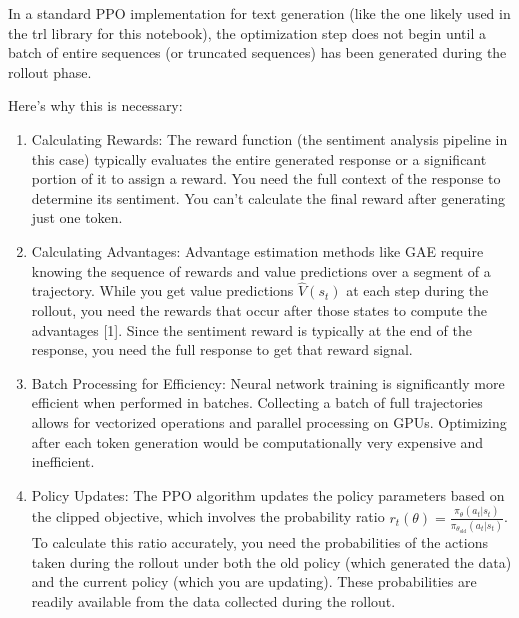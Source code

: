 \documentclass[10pt,a4paper]{report}
\begin{document}
In a standard PPO implementation for text generation (like the one likely used in the trl library for this notebook), the optimization step does not begin until a batch of entire sequences (or truncated sequences) has been generated during the rollout phase.

Here's why this is necessary:
\begin{enumerate}
\item    Calculating Rewards: The reward function (the sentiment analysis pipeline in this case) typically evaluates the entire generated response or a significant portion of it to assign a reward. You need the full context of the response to determine its sentiment. You can't calculate the final reward after generating just one token.
\item    Calculating Advantages: Advantage estimation methods like GAE require knowing the sequence of rewards and value predictions over a segment of a trajectory. While you get value predictions $\hat{V}(s_t)$ at each step during the rollout, you need the rewards that occur after those states to compute the advantages [1]. Since the sentiment reward is typically at the end of the response, you need the full response to get that reward signal.
\item    Batch Processing for Efficiency: Neural network training is significantly more efficient when performed in batches. Collecting a batch of full trajectories allows for vectorized operations and parallel processing on GPUs. Optimizing after each token generation would be computationally very expensive and inefficient.
\item    Policy Updates: The PPO algorithm updates the policy parameters based on the clipped objective, which involves the probability ratio $r_t(\theta) = \frac{\pi_\theta(a_t|s_t)}{\pi_{\theta_{\text{old}}}(a_t|s_t)}$. To calculate this ratio accurately, you need the probabilities of the actions taken during the rollout under both the old policy (which generated the data) and the current policy (which you are updating). These probabilities are readily available from the data collected during the rollout.
\end{enumerate}
\end{document}
